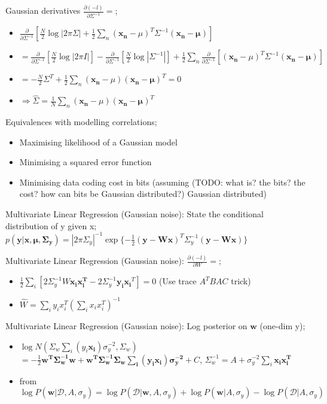 \documentclass{article}
\begin{document}
Gaussian derivatives $\frac{\partial(-l)}{\partial\Sigma^{-1}} = $; \begin{itemize} \item $\frac{\partial}{\partial\Sigma^{-1}}[\frac{N}{2}\log|2\pi\Sigma|+\frac{1}{2}\sum_n(\mathbf{x_n}-\mu)^T\Sigma^{-1}(\mathbf{x_n-\mu})]$ \item  $=\frac{\partial}{\partial\Sigma^{-1}}[\frac{N}{2}\log|2\pi I|] - \frac{\partial}{\partial\Sigma^{-1}}[\frac{N}{2}\log|\Sigma^{-1}|]+\frac{1}{2}\sum_n\frac{\partial}{\partial\Sigma^{-1}}[(\mathbf{x_n}-\mu)^T\Sigma^{-1}(\mathbf{x_n-\mu})]$ \item $ = -\frac{N}{2}\Sigma^T+\frac{1}{2}\sum_n (\mathbf{x_n}-\mu)(\mathbf{x_n-\mu})^T = 0$ \item $\Rightarrow \hat{\Sigma}=\frac{1}{N}\sum_n(\mathbf{x_n}-\mu)(\mathbf{x_n-\mu})^T$ \end{itemize}

Equivalences with modelling correlations; \begin{itemize} \item Maximising likelihood of a Gaussian model \item Minimising a squared error function \item Minimising data coding cost in bits (assuming (TODO: what is? the bits? the cost? how can bits be Gaussian distributed?) Gaussian distributed) \end{itemize}

Multivariate Linear Regression (Gaussian noise): State the conditional distribution of y given x; $p(\mathbf{y|x, \mu, \Sigma_y}) = |2\pi\Sigma_y|^{-1}\exp\{-\frac{1}{2}(\mathbf{y-Wx})^T\Sigma_y^{-1}(\mathbf{y-Wx})\}$

Multivariate Linear Regression (Gaussian noise): $\frac{\partial(-l)}{\partial W} = $; \begin{itemize} \item $\frac{1}{2}\sum_i [2\Sigma^{-1}_yW\mathbf{x_ix_i^T}-2\Sigma_y^{-1}\mathbf{y_ix_i}^T]=0$ (Use trace $A^TBAC$ trick) \item $\hat{W} = \sum_i y_ix_i^T(\sum_i x_i x_i^T)^{-1}$ \end{itemize}


Multivariate Linear Regression (Gaussian noise): Log posterior on $\mathbf{w}$ (one-dim y); \begin{itemize} \item $\log N(\Sigma_w\sum_i(y_i\mathbf{x_i})\sigma^{-2}_y,\Sigma_w)$ $ = -\frac{1}{2}\mathbf{w^T\Sigma_w^{-1}w+w^T\Sigma^{-1}_w\Sigma_w\sum_i(y_i\mathbf{x_i})\sigma_y^{-2}}+C$, $\Sigma_w^{-1} = A+\sigma_y^{-2}\sum_i \mathbf{x_ix_i^T}$ \item from $\log P(\mathbf{w}|\mathcal{D},A,\sigma_y) = \log P(\mathcal{D}|\mathbf{w},A, \sigma_y)+\log P(\mathbf{w}|A,\sigma_y)-\log P(\mathcal{D}|A,\sigma_y)$ \end{itemize}
\end{document}
